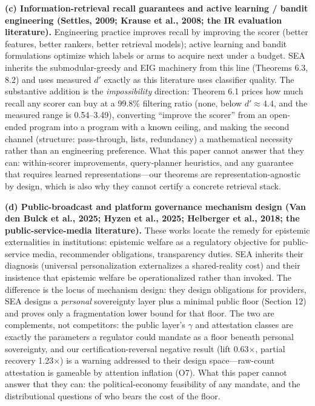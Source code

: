\documentclass[
  11pt]{article}
\begin{document}
\textbf{(c) Information-retrieval recall guarantees and active learning
/ bandit engineering (Settles, 2009; Krause et al., 2008; the IR
evaluation literature).} Engineering practice improves recall by
improving the scorer (better features, better rankers, better retrieval
models); active learning and bandit formulations optimize which labels
or arms to acquire next under a budget. SEA inherits the
submodular-greedy and EIG machinery from this line (Theorems 6.3, 8.2)
and uses measured \(d'\) exactly as this literature uses classifier
quality. The substantive addition is the \emph{impossibility} direction:
Theorem 6.1 prices how much recall any scorer can buy at a 99.8\%
filtering ratio (none, below \(d'\approx4.4\), and the measured range is
0.54--3.49), converting ``improve the scorer'' from an open-ended
program into a program with a known ceiling, and making the second
channel (structure: pass-through, lists, redundancy) a mathematical
necessity rather than an engineering preference. What this paper cannot
answer that they can: within-scorer improvements, query-planner
heuristics, and any guarantee that requires learned
representations---our theorems are representation-agnostic by design,
which is also why they cannot certify a concrete retrieval stack.

\textbf{(d) Public-broadcast and platform governance mechanism design
(Van den Bulck et al., 2025; Hyzen et al., 2025; Helberger et al., 2018;
the public-service-media literature).} These works locate the remedy for
epistemic externalities in institutions: epistemic welfare as a
regulatory objective for public-service media, recommender obligations,
transparency duties. SEA inherits their diagnosis (universal
personalization externalizes a shared-reality cost) and their insistence
that epistemic welfare be operationalized rather than invoked. The
difference is the locus of mechanism design: they design obligations for
providers, SEA designs a \emph{personal} sovereignty layer plus a
minimal public floor (Section 12) and proves only a fragmentation lower
bound for that floor. The two are complements, not competitors: the
public layer's \(\gamma\) and attestation classes are exactly the
parameters a regulator could mandate as a floor beneath personal
sovereignty, and our certification-reversal negative result (lift 0.63×,
partial recovery 1.23×) is a warning addressed to their design
space---raw-count attestation is gameable by attention inflation (O7).
What this paper cannot answer that they can: the political-economy
feasibility of any mandate, and the distributional questions of who
bears the cost of the floor.
\end{document}
